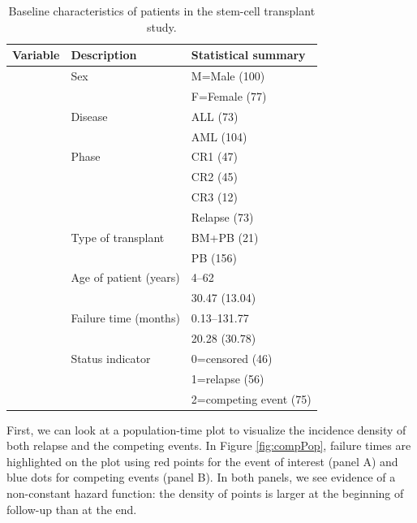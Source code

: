 \documentclass[
]{jss}
\begin{document}
\begin{CodeChunk}
\begin{table}

\caption{\label{tab:table1bmtcrr}Baseline characteristics of patients in the stem-cell transplant study.}
\centering
\begin{tabular}[t]{lll}
\toprule
Variable & Description & Statistical summary\\
\midrule
\code{Sex} & Sex & M=Male (100)\\
 &  & F=Female (77)\\
\code{D} & Disease & ALL (73)\\
 &  & AML (104)\\
\code{Phase} & Phase & CR1 (47)\\
\addlinespace
 &  & CR2 (45)\\
 &  & CR3 (12)\\
 &  & Relapse (73)\\
\code{Source} & Type of transplant & BM+PB (21)\\
 &  & PB (156)\\
\addlinespace
\code{Age} & Age of patient (years) & 4--62\\
 &  & 30.47 (13.04)\\
\code{ftime} & Failure time (months) & 0.13--131.77\\
 &  & 20.28 (30.78)\\
\code{Status} & Status indicator & 0=censored (46)\\
\addlinespace
 &  & 1=relapse (56)\\
 &  & 2=competing event (75)\\
\bottomrule
\end{tabular}
\end{table}

\end{CodeChunk}

First, we can look at a population-time plot to visualize the incidence
density of both relapse and the competing events. In Figure
\ref{fig:compPop}, failure times are highlighted on the plot using red
points for the event of interest (panel A) and blue dots for competing
events (panel B). In both panels, we see evidence of a non-constant
hazard function: the density of points is larger at the beginning of
follow-up than at the end.
\end{document}
